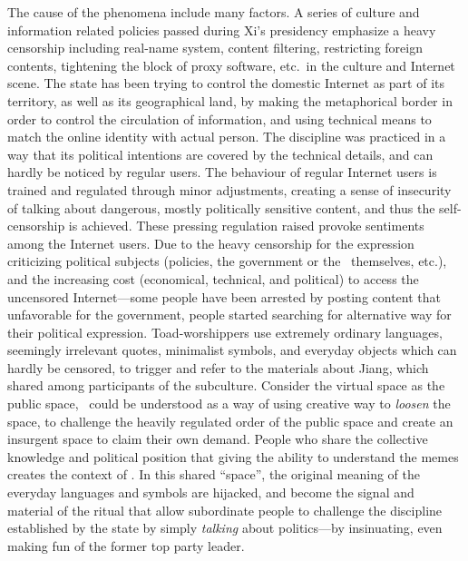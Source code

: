 The cause of the phenomena include many factors. A series of culture and information related policies passed during Xi's presidency emphasize a heavy censorship including real-name system, content filtering, restricting foreign contents, tightening the block of proxy software, etc.\ in the culture and Internet scene. The state has been trying to control the domestic Internet as part of its territory, as well as its geographical land, by making the  metaphorical border in order to control the circulation of information, and using technical means to match the online identity with actual person. The discipline was practiced in a way that its political intentions are covered by the technical details, and can hardly be noticed by regular users. The behaviour of regular Internet users is trained and regulated through minor adjustments, creating a sense of insecurity of talking about dangerous, mostly politically sensitive content, and thus the self-censorship is achieved. These pressing regulation raised provoke sentiments among the Internet users. Due to the heavy censorship for the expression criticizing political subjects (policies, the government or the \cpc\ themselves, etc.), and the increasing cost (economical, technical, and political) to access the uncensored Internet---some people have been arrested by posting content that unfavorable for the government, people started searching for alternative way for their political expression. Toad-worshippers use extremely ordinary languages, seemingly irrelevant quotes, minimalist symbols, and everyday objects which can hardly be censored, to trigger and refer to the materials about Jiang, which shared among participants of the subculture. Consider the virtual space as the public space, \moha\ could be understood as a way of using creative way to \textit{loosen} the space, to challenge the heavily regulated order of the public space and create an insurgent space to claim their own demand. People who share the collective knowledge and political position that giving the ability to understand the memes creates the context of \moha. In this shared ``space'', the original meaning of the everyday languages and symbols are hijacked, and become the signal and material of the ritual that allow subordinate people to challenge the discipline established by the state by simply \textit{talking} about politics---by insinuating, even making fun of the former top party leader.


